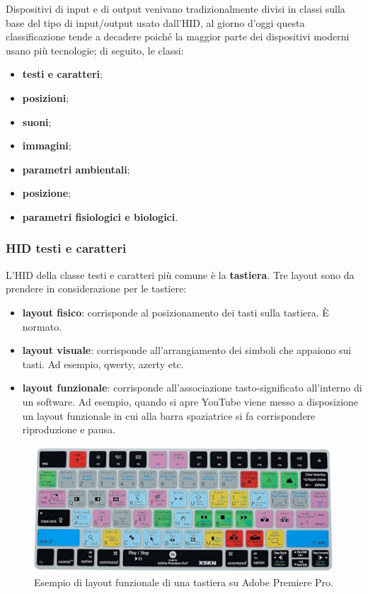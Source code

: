 Dispositivi di input e di output venivano tradizionalmente divisi in classi sulla base del tipo di input/output usato dall'HID, al giorno d'oggi questa
classificazione tende a decadere poich\'e la maggior parte dei dispositivi moderni usano più tecnologie; di seguito, le classi:
\begin{itemize}
	\itemsep-0.3em
	\item \textbf{testi e caratteri};
	\item \textbf{posizioni};
	\item \textbf{suoni};
	\item \textbf{immagini};
	\item \textbf{parametri ambientali};
	\item \textbf{posizione};
	\item \textbf{parametri fisiologici e biologici}.
\end{itemize}

\subsubsection*{HID testi e caratteri}
L'HID della classe testi e caratteri più comune è la \textbf{tastiera}.
Tre layout sono da prendere in considerazione per le tastiere:
\begin{itemize}
	\itemsep-0.3em 
	\item \textbf{layout fisico}: corrisponde al posizionamento dei tasti sulla tastiera. \`E normato.
	\item \textbf{layout visuale}: corrisponde all'arrangiamento dei simboli che appaiono sui tasti. Ad esempio, qwerty, azerty etc.
	\item \textbf{layout funzionale}: corrisponde all'associazione tasto-significato all'interno di un software. Ad esempio, quando si apre YouTube
	viene messo a disposizione un layout funzionale in cui alla barra spaziatrice si fa corrispondere riproduzione e pausa.
\end{itemize}

\begin{figure}[!h]
	\centering
	\includegraphics[scale=0.25]{immagini/adobe-layout-funzionale.png}
	\caption{Esempio di layout funzionale di una tastiera su Adobe Premiere Pro.}
\end{figure}

